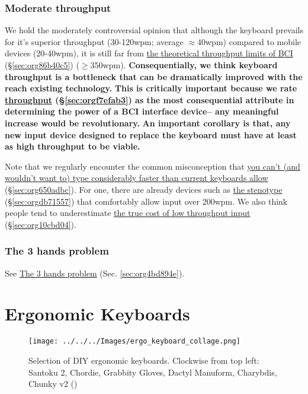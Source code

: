 \documentclass[logo,bsc,singlespacing,parskip]{infthesis}
\begin{document}
\subsection{Moderate throughput}
\label{sec:org628e096}
We hold the moderately controversial opinion that although the keyboard prevails for it's superior throughput (30-120wpm; average \(\approx\)40wpm) compared to mobile devices (20-40wpm), it is still far from \hyperref[sec:org86b40c5]{the theoretical throughput limits of BCI} (\S \ref{sec:org86b40c5}) (\(\ge\)350wpm).
\textbf{Consequentially, we think keyboard throughput is a bottleneck that can be dramatically improved with the reach existing technology.}
\textbf{This is critically important because we rate \hyperref[sec:orgf7efab3]{throughput} (\S \ref{sec:orgf7efab3}) as the most consequential attribute in determining the power of a BCI interface device-- any meaningful increase would be revolutionary.}
\textbf{An important corollary is that, any new input device designed to replace the keyboard must have at least as high throughput to be viable.}

Note that we regularly encounter the common misconception that \hyperref[sec:org650adbc]{you can't (and wouldn't want to) type considerably faster than current keyboards allow} (\S \ref{sec:org650adbc}).
For one, there are already devices such as \hyperref[sec:orgdb71557]{the stenotype} (\S \ref{sec:orgdb71557}) that comfortably allow input over 200wpm.
We also think people tend to underestimate \hyperref[sec:org10cbd04]{the true cost of low throughput input} (\S \ref{sec:org10cbd04}).

\subsection{The 3 hands problem}
\label{sec:org308ed34}
See \hyperref[sec:org4bd894e]{The 3 hands problem} (Sec. \ref{sec:org4bd894e}).

\chapter{Ergonomic Keyboards}
\label{sec:org895c4cc}
\begin{figure}[h]
\centering
\texttt{[image: ../../../Images/ergo\_keyboard\_collage.png]}
\caption[Collage of ergonomic keyboards]{\label{fig:ergo_collage}Selection of DIY ergonomic keyboards. Clockwise from top left: Santoku 2, Chordie, Grabbity Gloves, Dactyl Manuform, Charybdis, Chunky v2  (\autocite{ErgoMechBoards})}
\end{figure}
\end{document}
